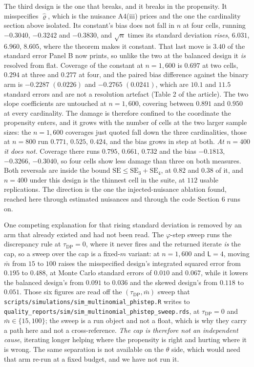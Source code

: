 \documentclass[
  12pt]{article}
\newcommand{\1}[1]{\mathds{1}\left[#1\right]}
\theoremstyle{plain}
\theoremstyle{definition}
\theoremstyle{definition}
\theoremstyle{remark}
\begin{document}
The third design is the one that breaks, and it breaks in the propensity. It
misspecifies $\hat\varrho$, which is the nuisance A4(iii) prices and the one the
cardinality section above isolated. Its constant's bias does not fall in $n$ at four
cells, running $-0.3040$, $-0.3242$ and $-0.3830$, and $\sqrt n$ times its
standard deviation \emph{rises}, $6.031$, $6.960$, $8.605$, where the theorem makes it
constant. That last move is $3.40$ of the standard error Panel B now prints, so
unlike the two at the balanced design it \emph{is} resolved from flat. Coverage of the constant at $n=1{,}600$ is $0.697$ at two cells, $0.294$
at three and $0.277$ at four, and the paired bias difference against the binary
arm is $-0.2287$ $(0.0226)$ and $-0.2765$ $(0.0241)$, which are $10.1$ and $11.5$
standard errors and are not a resolution artefact
(Table 2 of the article). The two slope coefficients are untouched
at $n=1{,}600$, covering between $0.891$ and $0.950$ at every cardinality. The
damage is therefore confined to the coordinate the propensity enters, and it
grows with the number of cells at the two larger sample sizes: the $n=1{,}600$
coverages just quoted fall down the three cardinalities, those at $n=800$ run
$0.771$, $0.525$, $0.424$, and the bias grows in step at both. \emph{At $n=400$ it
does not.} Coverage there runs $0.795$, $0.661$, $0.732$ and
the bias $-0.1813$, $-0.3266$, $-0.3040$, so four cells show less damage than
three on both measures. Both reversals are inside the bound
$\mathrm{SE}\le\mathrm{SE}_3+\mathrm{SE}_4$, at $0.82$ and $0.38$ of it, and
$n=400$ under this design is the thinnest cell in the suite, at $112$ usable
replications. The direction is the one the injected-nuisance ablation found,
reached here through estimated nuisances and through the code Section 6 runs
on.

One competing explanation for that rising standard deviation is removed by an arm
that already existed and had not been read. The $\varphi$-step sweep runs the
discrepancy rule at $\tau_{\mathrm{DP}}=0$, where it never fires and the returned
iterate \emph{is} the cap, so a sweep over the cap is a fixed-$m$ variant: at
$n=1{,}600$ and $\mathsf L=4$, moving $\bar m$ from $15$ to $100$ raises the
misspecified design's integrated squared error from $0.195$ to $0.488$, at Monte
Carlo standard errors of $0.010$ and $0.067$, while it lowers the balanced
design's from $0.091$ to $0.036$ and the skewed design's from $0.118$ to $0.051$.
Those six figures are read off the $(\tau_{\mathrm{DP}},\bar m)$ sweep that
\texttt{scripts/simulations/sim\_multinomial\_phistep.R} writes to
\texttt{quality\_reports/sim/sim\_multinomial\_phistep\_sweep.rds}, at
$\tau_{\mathrm{DP}}=0$ and $\bar m\in\{15,100\}$; the sweep is a run object and
not a float, which is why they carry a path here and not a cross-reference.
\emph{The cap is therefore not an independent cause}, iterating longer helping where
the propensity is right and hurting where it is wrong. The same separation is not
available on the $\theta$ side, which would need that arm re-run at a fixed
budget, and we have not run it.
\end{document}
